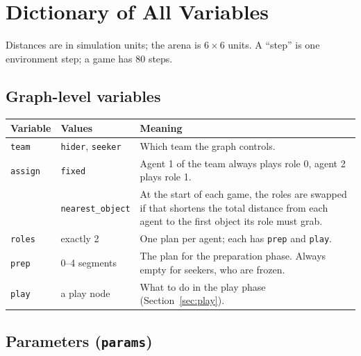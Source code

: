 \documentclass[11pt]{article}
\begin{document}
\section{Dictionary of All Variables}
\label{sec:dictionary}

Distances are in simulation units; the arena is $6 \times 6$ units. A ``step''
is one environment step; a game has 80 steps.

\subsection{Graph-level variables}

\begin{tabularx}{\linewidth}{@{}l l Y@{}}
  \toprule
  Variable & Values & Meaning \\
  \midrule
  \texttt{team}   & \texttt{hider}, \texttt{seeker} & Which team the graph controls. \\
  \texttt{assign} & \texttt{fixed} & Agent 1 of the team always plays role 0, agent 2 plays role 1. \\
                  & \texttt{nearest\_object} & At the start of each game, the roles are swapped if
                    that shortens the total distance from each agent to the first object its role must grab. \\
  \texttt{roles}  & exactly 2 & One plan per agent; each has \texttt{prep} and \texttt{play}. \\
  \texttt{prep}   & 0--4 segments & The plan for the preparation phase. Always empty for seekers, who are frozen. \\
  \texttt{play}   & a play node & What to do in the play phase (Section~\ref{sec:play}). \\
  \bottomrule
\end{tabularx}

\subsection{Parameters (\texttt{params})}
\end{document}
